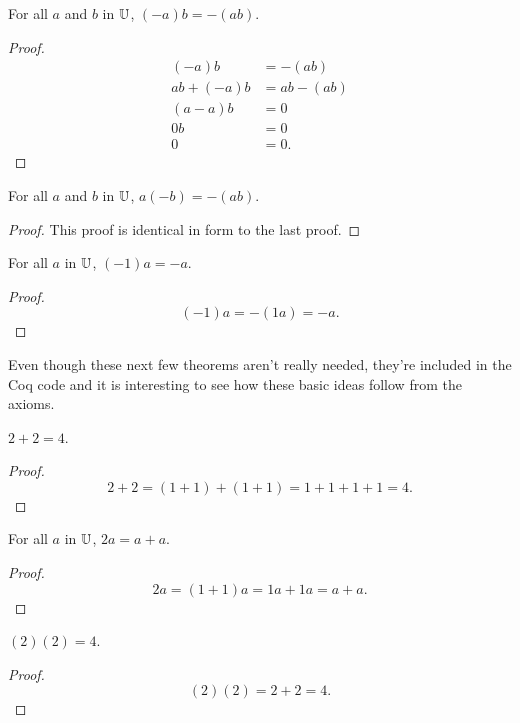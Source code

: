 \documentclass[../math.tex]{subfiles}
\begin{document}
\begin{theorem}
    For all $a$ and $b$ in $\mathbb{U}$, $(-a)b = -(ab)$.
\end{theorem}
\begin{proof}
    \begin{align*}
        (-a)b &= -(ab) \\
        ab + (-a)b &= ab - (ab) \\
        (a - a)b &= 0 \\
        0b &= 0 \\
        0 &= 0.
    \end{align*}
\end{proof}

\begin{theorem}
    For all $a$ and $b$ in $\mathbb{U}$, $a(-b) = -(ab)$.
\end{theorem}
\begin{proof}
    This proof is identical in form to the last proof.
\end{proof}

\begin{theorem}
    For all $a$ in $\mathbb{U}$, $(-1)a = -a$.
\end{theorem}
\begin{proof}
    \[
        (-1)a = -(1a) = -a.
    \]
\end{proof}

Even though these next few theorems aren't really needed, they're included in
the Coq code and it is interesting to see how these basic ideas follow from the
axioms.

\begin{theorem}
    $2 + 2 = 4$.
\end{theorem}
\begin{proof}
    \[
        2 + 2 = (1 + 1) + (1 + 1) = 1 + 1 + 1 + 1 = 4.
    \]
\end{proof}

\begin{theorem}
    For all $a$ in $\mathbb{U}$, $2a = a + a$.
\end{theorem}
\begin{proof}
    \[
        2a = (1 + 1)a = 1a + 1a = a + a.
    \]
\end{proof}

\begin{theorem}
    $(2)(2) = 4$.
\end{theorem}
\begin{proof}
    \[
        (2)(2) = 2 + 2 = 4.
    \]
\end{proof}
\end{document}
